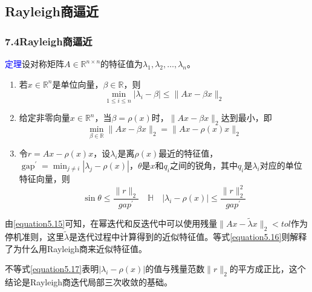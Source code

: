 \documentclass[notheorems,serif]{beamer}
\begin{document}
\subsection*{Rayleigh商逼近}
\begin{frame}
\frametitle{7.4\qquad Rayleigh商逼近}


\textcolor{blue}{定理}\quad 设对称矩阵$A \in \mathbb{R}^{n \times n}$的特征值为$\lambda_{1}, \lambda_{2}, \ldots, \lambda_{n}$。
\begin{enumerate}[(1)]
	\item 若$x \in \mathbb{R}^{n}$是单位向量，$\beta \in \mathbb{R}$，则\begin{equation}
	\min _{1 \leq i \leq n}\left|\lambda_{i}-\beta\right| \leq\|A x-\beta x\|_{2}
	\label{equation5.15}
	\end{equation}
	\item 给定非零向量$x \in \mathbb{R}^{n}$，当$\beta=\rho(x)$时，$\|A x-\beta x\|_{2}$达到最小，即\begin{equation}
	\min _{\beta \in \mathbb{R}}\|A x-\beta x\|_{2}=\|A x-\rho(x) x\|_{2}
	\label{equation5.16}
	\end{equation}
	\item 令$r=A x-\rho(x) x$，设$\lambda_{i}$是离$\rho(x)$最近的特征值，$\operatorname{gap}^{\prime}=\min _{j \neq i} | \lambda_{j}-\rho(x) |$，$\theta$是$x$和$q_i$之间的锐角，其中$q_i$是$\lambda_{i}$对应的单位特征向量，则\begin{equation}
	\sin \theta \leq \frac{\|r\|_{2}}{g a p^{\prime}} \quad \mathbb{H} \quad\left|\lambda_{i}-\rho(x)\right| \leq \frac{\|r\|_{2}^{2}}{g a p^{\prime}}
	\label{equation5.17}
	\end{equation}
\end{enumerate}
\end{frame}
\begin{frame}

由\ref{equation5.15}可知，在幂迭代和反迭代中可以使用残量$\|A x-\tilde{\lambda} x\|_{2}<t o l$作为停机准则，这里$\tilde{\lambda}$是迭代过程中计算得到的近似特征值。等式\ref{equation5.16}则解释了为什么用Rayleigh商来近似特征值。

不等式\ref{equation5.17}表明$\left|\lambda_{i}-\rho(x)\right|$的值与残量范数$\|r\|_{2}$的平方成正比，这个结论是Rayleigh商迭代局部三次收敛的基础。
\end{frame}
\end{document}
